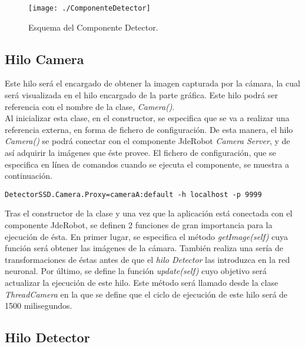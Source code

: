 \documentclass[a4paper, 12pt, oneside]{book}
\begin{document}
\begin{figure}[H]
\begin{center}
\texttt{[image: ./ComponenteDetector]}
\caption{Esquema del Componente Detector.}
\label{ComponenteDetector}
\end{center}
\end{figure}

\subsection{Hilo Camera}

Este hilo será el encargado de obtener la imagen capturada por la cámara, la cual será visualizada en el hilo encargado de la parte gráfica. Este hilo podrá ser referencia con el nombre de la clase, \textit{Camera()}.\\

Al inicializar esta clase, en el constructor, se especifica que se va a realizar una referencia externa, en forma de fichero de configuración. De esta manera, el hilo \textit{Camera()} se podrá conectar con el componente JdeRobot \textit{Camera Server}, y de así adquirir la imágenes que éste provee. El fichero de configuración, que se especifica en línea de comandos cuando se ejecuta el componente, se muestra a continuación.\\

\begin{lstlisting}[frame=single]
DetectorSSD.Camera.Proxy=cameraA:default -h localhost -p 9999
\end{lstlisting}

Tras el constructor de la clase y una vez que la aplicación está conectada con el componente JdeRobot, se definen 2 funciones de gran importancia para la ejecución de ésta. En primer lugar, se especifica el método \textit{getImage(self)} cuya función será obtener las imágenes de la cámara. También realiza una sería de transformaciones de éstas antes de que el \textit{hilo Detector} las introduzca en la red neuronal. Por último, se define la función \textit{update(self)} cuyo objetivo será actualizar la ejecución de este hilo. Este método será llamado desde la clase \textit{ThreadCamera} en la que se define que el ciclo de ejecución de este hilo será de 1500 milisegundos.

\subsection{Hilo Detector}
\end{document}
